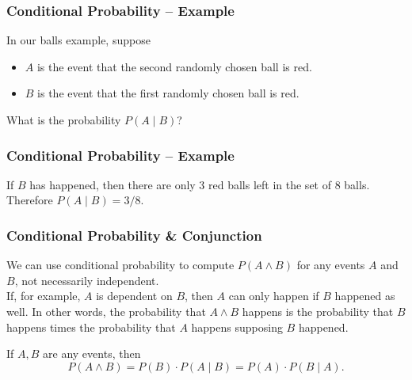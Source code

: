 \documentclass[aspectratio=169,11pt,usenames,dvipsnames]{beamer}
\begin{document}
\begin{frame}
 \frametitle{Conditional Probability -- Example}
 \begin{center}
 \end{center}
 In our balls example, suppose
 \begin{itemize}
  \item $A$ is the event that the \alert{second} randomly chosen ball is red.
  \item $B$ is the event that the \alert{first} randomly chosen ball is red.
 \end{itemize}
 \pause
 What is the probability $P(A \mid B)$?
\end{frame}

\begin{frame}
 \frametitle{Conditional Probability -- Example}
 \begin{center}
 \end{center}
 If $B$ has happened, then there are only 3 red balls left in the set of 8
 balls.\pause\\
 Therefore $P(A \mid B) = 3 / 8$.
\end{frame}

\begin{frame}
 \frametitle{Conditional Probability \& Conjunction}
 We can use conditional probability to compute $P(A \wedge B)$ for \alert{any}
 events $A$ and $B$, not necessarily independent.\pause\\
 If, for example, $A$ is dependent on $B$, then $A$ can \alert{only happen if
 $B$ happened as well}. \pause
 In other words, the probability that $A \wedge B$ happens is the probability
 that $B$ happens times the probability that $A$ happens \alert{supposing $B$
 happened}.
 \pause
 \begin{tcolorbox}[title=Event Conjunction Formula]
  If $A,B$ are \alert{any} events, then
  \[
   P(A \wedge B) = P(B) \cdot P(A \mid B) = P(A) \cdot P(B \mid A).
  \]
 \end{tcolorbox}
\end{frame}
\end{document}
